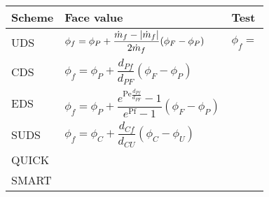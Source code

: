 \begin{table}[h]
	\centering
	\begin{tabular}{lll}
		\toprule[0.50mm]
		\textbf{Scheme} & \textbf{Face value} & \textbf{Test} \\
		\midrule[0.25mm]
		UDS & 
		$\phi_f = \phi_P + \dfrac{\dot{m}_f - \abs{\dot{m}_f}}{2 \dot{m}_f} (\phi_F - \phi_P)$ & 
		$\phi_f = $\\ \midrule[0.1mm]
		CDS & $\phi_f = \phi_P + \dfrac{d_{Pf}}{d_{PF}} (\phi_F - \phi_P)$ \\  \midrule[0.1mm]
		EDS & $\phi_f = \phi_P +
		\dfrac{e^{\mathrm{Pe} \frac{d_{Pf}}{d_{PF}}} - 1}{e^{\mathrm{Pf}} - 1} (\phi_F - \phi_P)$ \\  \midrule[0.1mm]
		SUDS & $\phi_f = \phi_C + \dfrac{d_{Cf}}{d_{CU}} (\phi_C - \phi_U)$ \\  \midrule[0.1mm]
		QUICK & \\  \midrule[0.1mm]
		SMART & \\
		\bottomrule[0.50mm]
	\end{tabular}
\end{table}